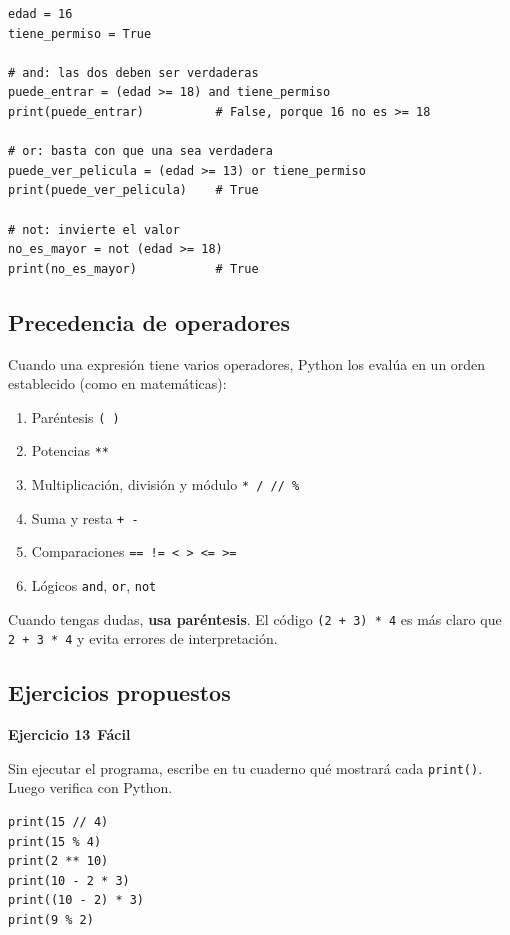 \documentclass[11pt,a4paper]{article}
\newcommand{\facil}{\textcolor{verdeSignal}{\faIcon{circle}\,\textbf{Fácil}}}
\begin{document}
\begin{cajaEjemplo}
\begin{lstlisting}[style=pythonStyle, caption={Usando operadores lógicos}]
edad = 16
tiene_permiso = True

# and: las dos deben ser verdaderas
puede_entrar = (edad >= 18) and tiene_permiso
print(puede_entrar)          # False, porque 16 no es >= 18

# or: basta con que una sea verdadera
puede_ver_pelicula = (edad >= 13) or tiene_permiso
print(puede_ver_pelicula)    # True

# not: invierte el valor
no_es_mayor = not (edad >= 18)
print(no_es_mayor)           # True
\end{lstlisting}
\end{cajaEjemplo}

\subsection{Precedencia de operadores}

Cuando una expresión tiene varios operadores, Python los evalúa en un orden establecido (como en matemáticas):

\begin{enumerate}
    \item Paréntesis \texttt{( )}
    \item Potencias \texttt{**}
    \item Multiplicación, división y módulo \texttt{* / // \%}
    \item Suma y resta \texttt{+ -}
    \item Comparaciones \texttt{== != < > <= >=}
    \item Lógicos \texttt{and}, \texttt{or}, \texttt{not}
\end{enumerate}

\begin{cajaRecuerda}
Cuando tengas dudas, \textbf{usa paréntesis}. El código \texttt{(2 + 3) * 4} es más claro que \texttt{2 + 3 * 4} y evita errores de interpretación.
\end{cajaRecuerda}

\subsection{Ejercicios propuestos}

\begin{cajaEjercicio}
\textbf{Ejercicio 13} \facil

Sin ejecutar el programa, escribe en tu cuaderno qué mostrará cada \texttt{print()}. Luego verifica con Python.
\begin{lstlisting}[style=pythonStyle]
print(15 // 4)
print(15 % 4)
print(2 ** 10)
print(10 - 2 * 3)
print((10 - 2) * 3)
print(9 % 2)
\end{lstlisting}
\end{cajaEjercicio}
\end{document}
